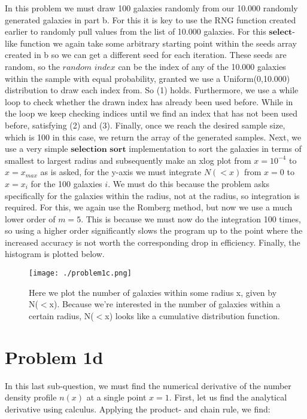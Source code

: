 In this problem we must draw 100 galaxies randomly from our 10.000 randomly generated galaxies in part b. For this it is key to use the RNG function created earlier to randomly pull values from the list of 10.000 galaxies. For this $\textbf{select}$-like function we again take some arbitrary starting point within the seeds array created in b so we can get a different seed for each iteration. These seeds are random, so the $\textit{random index}$ can be the index of any of the 10.000 galaxies within the sample with equal probability, granted we use a Uniform(0,10.000) distribution to draw each index from. So (1) holds. Furthermore, we use a while loop to check whether the drawn index has already been used before. While in the loop we keep checking indices until we find an index that has not been used before, satisfying (2) and (3). Finally, once we reach the desired sample size, which is 100 in this case, we return the array of the generated samples. Next, we use a very simple $\textbf{selection sort}$ implementation to sort the galaxies in terms of smallest to largest radius and subsequently make an xlog plot from $x=10^{-4}$ to $x = x_{max}$ as is asked, for the y-axis we must integrate $N(<x)$ from $x=0$ to $x=x_i$ for the 100 galaxies $i$. We must do this because the problem asks specifically for the galaxies within the radius, not at the radius, so integration is required. For this, we again use the Romberg method, but now we use a much lower order of $m=5$. This is because we must now do the integration 100 times, so using a higher order significantly slows the program up to the point where the increased accuracy is not worth the corresponding drop in efficiency. Finally, the histogram is plotted below.

\begin{figure}[h!]
  \centering
  \texttt{[image: ./problem1c.png]}
  \caption{Here we plot the number of galaxies within some radius x, given by N($<$x). Because we're interested in the number of galaxies within a certain radius, N($<$x) looks like a cumulative distribution function.}
\end{figure}

\newpage
\section*{Problem 1d}

In this last sub-question, we must find the numerical derivative of the number density profile $n(x)$ at a single point $x=1$. First, let us find the analytical derivative using calculus. Applying the product- and chain rule, we find:\\

